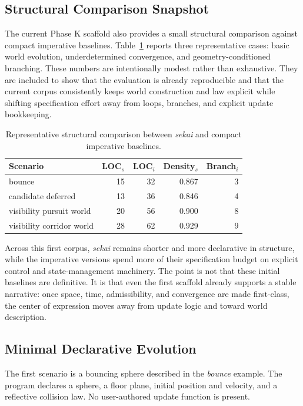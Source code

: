 \documentclass[sigplan,review,anonymous]{acmart}
\begin{document}
\subsection{Structural Comparison Snapshot}

The current Phase K scaffold also provides a small structural comparison against compact imperative baselines.
Table~\ref{tab:baseline-snapshot} reports three representative cases: basic world evolution, underdetermined convergence, and geometry-conditioned branching.
These numbers are intentionally modest rather than exhaustive.
They are included to show that the evaluation is already reproducible and that the current corpus consistently keeps world construction and law explicit while shifting specification effort away from loops, branches, and explicit update bookkeeping.

\begin{table}[t]
  \caption{Representative structural comparison between \emph{sekai} and compact imperative baselines.}
  \label{tab:baseline-snapshot}
  \centering
  \small
  \begin{tabular}{lrrrr}
    \toprule
    Scenario & LOC$_s$ & LOC$_i$ & Density$_s$ & Branch$_i$ \\
    \midrule
    bounce & 15 & 32 & 0.867 & 3 \\
    candidate deferred & 13 & 36 & 0.846 & 4 \\
    visibility pursuit world & 20 & 56 & 0.900 & 8 \\
    visibility corridor world & 28 & 62 & 0.929 & 9 \\
    \bottomrule
  \end{tabular}
\end{table}

Across this first corpus, \emph{sekai} remains shorter and more declarative in structure, while the imperative versions spend more of their specification budget on explicit control and state-management machinery.
The point is not that these initial baselines are definitive.
It is that even the first scaffold already supports a stable narrative: once space, time, admissibility, and convergence are made first-class, the center of expression moves away from update logic and toward world description.

\subsection{Minimal Declarative Evolution}

The first scenario is a bouncing sphere described in the \emph{bounce} example.
The program declares a sphere, a floor plane, initial position and velocity, and a reflective collision law.
No user-authored update function is present.
\end{document}

